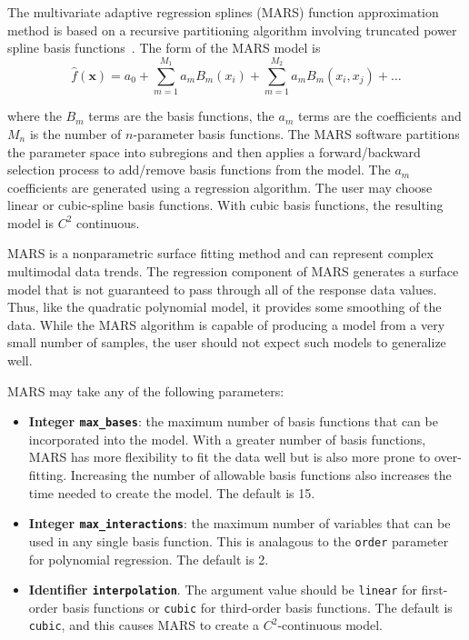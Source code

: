 \documentclass{article}
\begin{document}
The multivariate adaptive regression splines (MARS) function approximation method is based on a recursive partitioning algorithm involving truncated power spline basis functions~\cite{friedman}.  The form of the MARS model is
\begin{equation}
  \hat{f}(\mathbf{x})= a_0 + \sum_{m=1}^{M_1}a_{m}B_{m}(x_i) +  \sum_{m=1}^{M_2}a_{m}B_{m}(x_i,x_j)+\ldots
  \label{models:surf:equation10}  
\end{equation}

where the $B_{m}$ terms are the basis functions, the $a_{m}$ terms are the coefficients and $M_n$ is the number of $n$-parameter basis functions. The MARS software partitions the parameter space into subregions and then
applies a forward/backward selection process to add/remove basis functions from the model.  The $a_m$ coefficients are generated using a regression algorithm.  The user may choose linear or cubic-spline basis functions.  With cubic basis functions, the resulting model is $C^2$ continuous.  

MARS is a nonparametric surface fitting method and can represent
complex multimodal data trends. The regression component of MARS
generates a surface model that is not guaranteed to pass through all
of the response data values. Thus, like the quadratic polynomial
model, it provides some smoothing of the data.  While the MARS algorithm is capable of producing a model from a very small number of samples, the user should not expect such models to generalize well.   

MARS may take any of the following parameters:
\begin{itemize}
\item {\bf Integer \texttt{max\_bases}}: the maximum number of basis functions that can be incorporated into the model.  With a greater number of basis functions, MARS has more flexibility to fit the data well but is also more prone to over-fitting.  Increasing the number of allowable basis functions also increases the time needed to create the model.  The default is 15.
\item {\bf Integer \texttt{max\_interactions}}: the maximum number of variables that can be used in any single basis function.  This is analagous to the \texttt{order} parameter for polynomial regression.  The default is 2.
\item {\bf Identifier \texttt{interpolation}}.  The argument value should be \texttt{linear} for first-order basis functions or \texttt{cubic} for third-order basis functions.  The default is \texttt{cubic}, and this causes MARS to create a $C^2$-continuous model.
\end{itemize}
\end{document}
